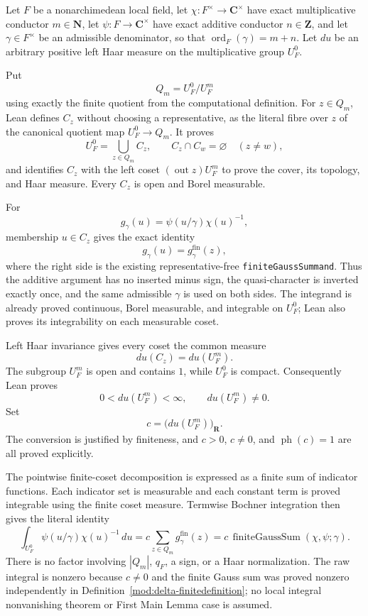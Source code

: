 \begin{theorem}\label{mod:delta-integralfinitebridge}
Let $F$ be a nonarchimedean local field, let
$\chi:F^\times\to\mathbf C^\times$ have exact multiplicative conductor
$m\in\mathbf N$, let $\psi:F\to\mathbf C^\times$ have exact additive
conductor $n\in\mathbf Z$,
and let $\gamma\in F^\times$ be an admissible denominator, so that
$\operatorname{ord}_F(\gamma)=m+n$.  Let $du$ be an arbitrary positive
left Haar measure on the multiplicative group $U_F^0$.

Put
\[
 Q_m=U_F^0/U_F^m
\]
using exactly the finite quotient from the computational definition.  For
$z\in Q_m$, Lean defines $C_z$ without choosing a representative, as the
literal fibre over $z$ of the canonical quotient map $U_F^0\to Q_m$.  It
proves
\[
 U_F^0=\bigcup_{z\in Q_m}C_z,
 \qquad C_z\cap C_w=\varnothing\quad(z\ne w),
\]
and identifies $C_z$ with the left coset
$(\operatorname{out}z)U_F^m$ to prove the cover, its topology, and Haar
measure.  Every $C_z$ is open and Borel measurable.

For
\[
 g_\gamma(u)=\psi(u/\gamma)\chi(u)^{-1},
\]
membership $u\in C_z$ gives the exact identity
\[
 g_\gamma(u)=g^{\mathrm{fin}}_\gamma(z),
\]
where the right side is the existing representative-free
\texttt{finiteGaussSummand}.  Thus the additive argument has no inserted
minus sign, the quasi-character is inverted exactly once, and the same
admissible $\gamma$ is used on both sides.  The integrand is already proved
continuous, Borel measurable, and integrable on $U_F^0$; Lean also proves
its integrability on each measurable coset.

Left Haar invariance gives every coset the common measure
\[
 du(C_z)=du(U_F^m).
\]
The subgroup $U_F^m$ is open and contains $1$, while $U_F^0$ is compact.
Consequently Lean proves
\[
 0<du(U_F^m)<\infty,
 \qquad du(U_F^m)\ne0.
\]
Set
\[
 c=\bigl(du(U_F^m)\bigr)_{\mathbf R}.
\]
The conversion is justified by finiteness, and $c>0$, $c\ne0$, and
$\operatorname{ph}(c)=1$ are all proved explicitly.

The pointwise finite-coset decomposition is expressed as a finite sum of
indicator functions.  Each indicator set is measurable and each constant
term is proved integrable using the finite coset measure.  Termwise Bochner
integration then gives the literal identity
\[
 \int_{U_F^0}\psi(u/\gamma)\chi(u)^{-1}\,du
   =c\sum_{z\in Q_m}g^{\mathrm{fin}}_\gamma(z)
   =c\,\operatorname{finiteGaussSum}(\chi,\psi;\gamma).
\]
There is no factor involving $|Q_m|$, $q_F$, a sign, or a Haar
normalization.  The raw integral is nonzero because $c\ne0$ and the finite
Gauss sum was proved nonzero independently in
Definition~\ref{mod:delta-finitedefinition}; no local integral
nonvanishing theorem or First Main Lemma case is assumed.


\end{theorem}
